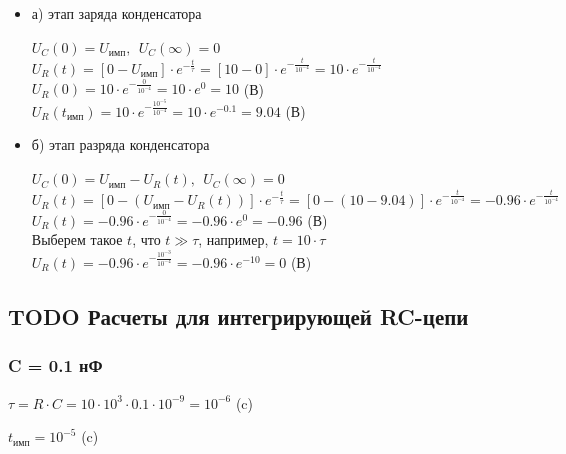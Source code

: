 \begin{itemize}
\item[] а) этап заряда конденсатора

		$U_C(0)	= U_\text{имп},\ \ U_C(\infty) = 0$\\		
		$U_R(t) = [0 - U_\text{имп}] \cdot e^{-\frac{t}{\tau}} = [10 - 0] \cdot e^{-\frac{t}{10^{-4}}} = 10 \cdot e^{-\frac{t}{10^{-4}}}$\\
		$U_R(0) = 10 \cdot e^{-\frac{0}{10^{-4}}} = 10 \cdot e^0 = 10$ (В)\\
		$U_R(t_\text{имп}) = 10 \cdot e^{-\frac{10^{-5}}{10^{-4}}} = 10 \cdot e^{-0.1} = 9.04$ (В)\\

\item[] б) этап разряда конденсатора
		
		$U_C(0)	= U_\text{имп} - U_R(t),\ \ U_C(\infty) = 0$\\
		$U_R(t) = [0 - (U_\text{имп} - U_R(t))] \cdot e^{-\frac{t}{\tau}} = [0 - (10 - 9.04)] \cdot e^{-\frac{t}{10^{-4}}} = -0.96 \cdot e^{-\frac{t}{10^{-4}}}$\\
		$U_R(t) = -0.96 \cdot e^{-\frac{0}{10^{-4}}} = -0.96 \cdot e^0 = -0.96$ (В)\\
		Выберем такое $t$, что $t \gg \tau$, например, $t = 10 \cdot \tau$ \\
		$U_R(t) = -0.96 \cdot e^{-\frac{10^{-3}}{10^{-4}}} = -0.96 \cdot e^{-10} = 0$ (В)\\
		
\end{itemize}

\subsection{TODO Расчеты для интегрирующей RC-цепи}

\subsubsection{C = 0.1 нФ}

		$\tau = R \cdot C = 10 \cdot 10^3 \cdot 0.1 \cdot 10^{-9} = 10^{-6}$ (c)
		
		$t_\text{имп} = 10^{-5}$ (c)
		
